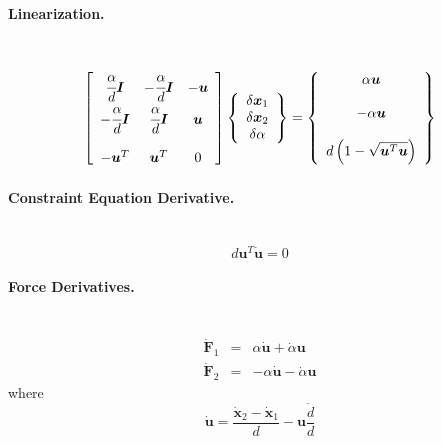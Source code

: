\documentclass[10pt,dvips,fleqn]{report}
\newcommand{\T}[1]{\boldsymbol{#1}}
\begin{document}
\paragraph{Linearization.} \
\begin{equation}
	\sqbr{\matr{ccc}{
		\cfrac{\alpha}{d}\T{I} & -\cfrac{\alpha}{d}\T{I} & -\T{u} \\
		-\cfrac{\alpha}{d}\T{I} & \cfrac{\alpha}{d}\T{I} & \T{u} \\
		\\
		-\T{u}^T & \T{u}^T & 0
	}}\cubr{\cvvect{
		\delta\T{x}_1 \\
		\delta\T{x}_2 \\
		\delta\alpha
	}} = \cubr{\cvvect{
		\alpha \T{u} \\
		\\
		- \alpha \T{u} \\
		\\
		d\plbr{1 - \sqrt{\T{u}^T \T{u}}}
	}}
\end{equation}

\paragraph{Constraint Equation Derivative.} \
\begin{equation}
	d \T{u}^T \dot{\T{u}} = 0
\end{equation}

\paragraph{Force Derivatives.} \
\begin{eqnarray}
	\dot{\T{F}}_1 & = & \alpha \dot{\T{u}} + \dot{\alpha} \T{u} \\
	\dot{\T{F}}_2 & = & -\alpha \dot{\T{u}} - \dot{\alpha} \T{u}
\end{eqnarray}
where
\begin{equation}
	\dot{\T{u}} = \frac{\dot{\T{x}}_2 - \dot{\T{x}}_1}{d} - \T{u} \frac{\dot{d}}{d}
\end{equation}
\end{document}
